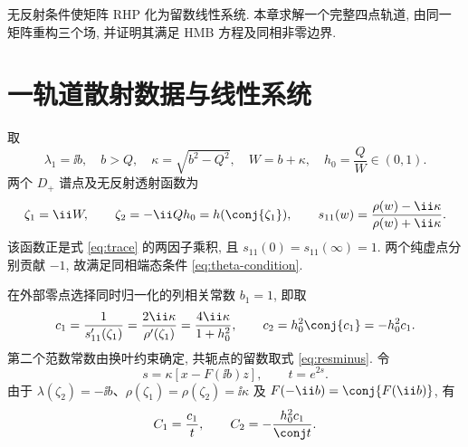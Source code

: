 无反射条件使矩阵 RHP 化为留数线性系统. 本章求解一个完整四点轨道, 由同一矩阵重构三个场, 并证明其满足 HMB 方程及同相非零边界.

\section{一轨道散射数据与线性系统}
取
\begin{equation}\label{eq:imaginarypoint}
\lambda_1=\ii b,\quad b>Q,\quad
\kappa=\sqrt{b^2-Q^2},\quad W=b+\kappa,\quad h_0=\dfrac{Q}{W}\in(0,1).
\end{equation}
两个 $D_+$ 谱点及无反射透射函数为
\begin{equation}\label{eq:onezeros}
\zeta_1=\ii W,\qquad \zeta_2=-\ii Qh_0=h(\conj{\zeta_1}),
\qquad s_{11}(w)=\dfrac{\rho(w)-\ii\kappa}{\rho(w)+\ii\kappa}.
\end{equation}
该函数正是式 \eqref{eq:trace} 的两因子乘积, 且 $s_{11}(0)=s_{11}(\infty)=1$. 两个纯虚点分别贡献 $-1$, 故满足同相端态条件 \eqref{eq:theta-condition}.

在外部零点选择同时归一化的列相关常数 $b_1=1$, 即取
\begin{equation}\label{eq:onec}
c_1=\dfrac{1}{s_{11}'(\zeta_1)}
=\dfrac{2\ii\kappa}{\rho'(\zeta_1)}
=\dfrac{4\ii\kappa}{1+h_0^2},\qquad
c_2=h_0^2\conj{c_1}=-h_0^2c_1.
\end{equation}
第二个范数常数由换叶约束确定, 共轭点的留数取式 \eqref{eq:resminus}. 令
\begin{equation}\label{eq:orbit-phase}
s=\kappa[x-F(\ii b)z],\qquad t=e^{2s}.
\end{equation}
由于 $\lambda(\zeta_2)=-\ii b$、$\rho(\zeta_1)=\rho(\zeta_2)=\ii\kappa$ 及 $F(-\ii b)=\conj{F(\ii b)}$, 有
\[
C_1=\dfrac{c_1}{t},\qquad C_2=-\dfrac{h_0^2c_1}{\conj t}.
\]

